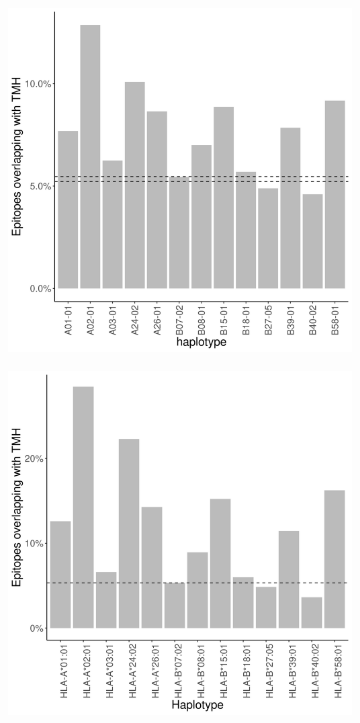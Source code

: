 \begin{figure}
  \centering
  \begin{subfigure}[t]{0.45\textwidth}
    \centering
    \caption{}
    \includegraphics[width=\linewidth]{bianchi_et_al_2017_results/fig_1a_bw.png}
    \label{fig:bianch_et_al_2017_1a}
  \end{subfigure}
  \hfill
  \begin{subfigure}[t]{0.45\textwidth}
    \centering
    \caption{}
    \includegraphics[width=\linewidth]{bbbq_1_smart_results/fig_f_tmh_2_human_mhc1_bw.png}
    \label{fig:bilderbeek_et_al_2021_1a}
  \end{subfigure}


\end{figure}
